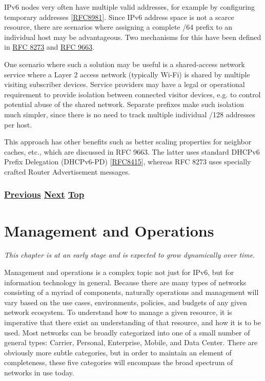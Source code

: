 \documentclass[
]{article}
\begin{document}
IPv6 nodes very often have multiple valid addresses, for example by
configuring temporary addresses
{[}\href{https://www.rfc-editor.org/info/rfc8981}{RFC8981}{]}. Since
IPv6 address space is not a scarce resource, there are scenarios where
assigning a complete /64 prefix to an individual host may be
advantageous. Two mechanisms for this have been defined in
\href{https://www.rfc-editor.org/info/rfc8273}{RFC 8273} and
\href{https://www.rfc-editor.org/info/rfc9663}{RFC 9663}.

One scenario where such a solution may be useful is a shared-access
network service where a Layer 2 access network (typically Wi-Fi) is
shared by multiple visiting subscriber devices. Service providers may
have a legal or operational requirement to provide isolation between
connected visitor devices, e.g. to control potential abuse of the shared
network. Separate prefixes make such isolation much simpler, since there
is no need to track multiple individual /128 addresses per host.

This approach has other benefits such as better scaling properties for
neighbor caches, etc., which are discussed in RFC 9663. The latter uses
standard DHCPv6 Prefix Delegation (DHCPv6-PD)
{[}\href{https://www.rfc-editor.org/info/rfc8415}{RFC8415}{]}, whereas
RFC 8273 uses specially crafted Router Advertisement messages.

\subsubsection{\texorpdfstring{\hyperref[address-planning]{Previous}
\hyperref[management-and-operations]{Next}
\hyperref[network-design]{Top}}{Previous Next Top}}\label{previous-next-top-25}

\pagebreak

\section{Management and Operations}\label{management-and-operations}

\emph{This chapter is at an early stage and is expected to grow
dynamically over time}.

Management and operations is a complex topic not just for IPv6, but for
information technology in general. Because there are many types of
networks consisting of a myriad of components, naturally operations and
management will vary based on the use cases, environments, policies, and
budgets of any given network ecosystem. To understand how to manage a
given resource, it is imperative that there exist an understanding of
that resource, and how it is to be used. Most networks can be broadly
categorized into one of a small number of general types: Carrier,
Personal, Enterprise, Mobile, and Data Center. There are obviously more
subtle categories, but in order to maintain an element of completeness,
these five categories will encompass the broad spectrum of networks in
use today.
\end{document}
